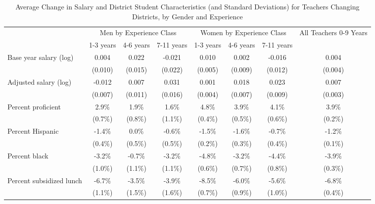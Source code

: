 \documentclass[]{article}
\begin{document}
\begin{sidewaystable}[ht]
\centering
\begin{tabular}{lccccccc}
  \hline
 & \multicolumn{3}{c}{Men by Experience Class} & \multicolumn{3}{c}{Women by Experience Class} & \multirow{2}{*}{\parbox{0.16\linewidth}{All Teachers 0-9 Years}}\\ \cline{2-4} \cline{5-7}
 & 1-3 years & 4-6 years & 7-11 years & 1-3 years & 4-6 years & 7-11 years &  \\ 
  \hline
Base year salary (log) & 0.004 & 0.022 & -0.021 & 0.010 & 0.002 & -0.016 & 0.004 \\ 
   & (0.010) & (0.015) & (0.022) & (0.005) & (0.009) & (0.012) & (0.004) \\ 
  Adjusted salary (log) & -0.012 & 0.007 & 0.031 & 0.001 & 0.018 & 0.023 & 0.007 \\ 
   & (0.007) & (0.011) & (0.016) & (0.004) & (0.007) & (0.009) & (0.003) \\ 
  Percent proficient & 2.9\% & 1.9\% & 1.6\% & 4.8\% & 3.9\% & 4.1\% & 3.9\% \\ 
   & (0.7\%) & (0.8\%) & (1.1\%) & (0.4\%) & (0.5\%) & (0.6\%) & (0.2\%) \\ 
  Percent Hispanic & -1.4\% & 0.0\% & -0.6\% & -1.5\% & -1.6\% & -0.7\% & -1.2\% \\ 
   & (0.4\%) & (0.5\%) & (0.5\%) & (0.2\%) & (0.3\%) & (0.4\%) & (0.1\%) \\ 
  Percent black & -3.2\% & -0.7\% & -3.2\% & -4.8\% & -3.2\% & -4.4\% & -3.9\% \\ 
   & (1.0\%) & (1.1\%) & (1.1\%) & (0.6\%) & (0.7\%) & (0.8\%) & (0.3\%) \\ 
  Percent subsidized lunch & -6.7\% & -3.5\% & -3.9\% & -8.5\% & -6.0\% & -5.6\% & -6.8\% \\ 
   & (1.1\%) & (1.5\%) & (1.6\%) & (0.7\%) & (0.9\%) & (1.0\%) & (0.4\%) \\ 
   \hline
\end{tabular}
\caption{Average Change in Salary and District Student Characteristics (and Standard Deviations) for Teachers Changing Districts, by Gender and Experience} 
\label{tbl:change_by_ge}
\end{sidewaystable}
\end{document}
